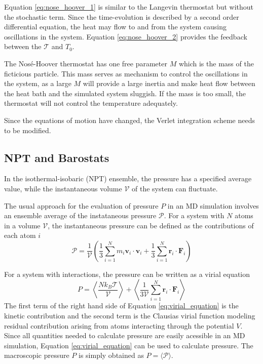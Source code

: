 Equation \ref{eq:nose_hoover_1} is similar to the Langevin thermostat but without the stochastic term.  Since the time-evolution is described by a second order differential equation, the heat may flow to and from the system causing oscillations in the system. Equation \ref{eq:nose_hoover_2} provides the feedback between the $\mathcal{T}$ and $T_0$.

The Nos\'e-Hoover thermostat has one free parameter $M$ which is the mass of the ficticious particle.  This mass serves as mechanism to control the oscillations in the system, as a large $M$ will provide a large inertia and make heat flow between the heat bath and the simulated system sluggish.  If the mass is too small, the thermostat will not control the temperature adequately.

Since the equations of motion have changed, the Verlet integration scheme needs to be modified.

\subsection{NPT and Barostats}
\label{sec:npt_ensemble}
In the isothermal-isobaric (NPT) ensemble, the pressure has a specified average value, while the instantaneous volume $\mathcal{V}$ of the system can fluctuate.

The usual approach for the evaluation of pressure $P$ in an MD simulation involves an ensemble average of the instataneous pressure $\mathcal{P}$\cite{allen1987_md}.  For a system with $N$ atoms in a volume $\mathcal{V}$, the instantaneous pressure can be defined as the contributions of each atom $i$
\begin{equation}
  \mathcal{P}
  =
  \frac{1}{\mathcal{V}}
  \left(
    \frac{1}{3}
    \sum_{i=1}^N m_i \bm{v}_i  \cdot \bm{v}_i
    +
    \frac{1}{3}
    \sum_{i=1}^N \bm{r}_i \cdot \bm{F}_i
  \right)
\end{equation}

For a system with interactions, the pressure can be written as a virial equation\cite{tadmor2011_md}
\begin{equation}
  \label{eq:virial_equation}
  P
	=
	\left\langle
	  \frac{N k_B \mathcal{T}}{\mathcal{V}}
  \right\rangle
  +
	\left\langle
	  \frac{1}
		     {3\mathcal{V}}
    \sum_{i=1}^N
        \bm{r}_i \cdot \bm{F}_{i}
	\right\rangle
\end{equation}
The first term of the right hand side of Equation \ref{eq:virial_equation} is the kinetic contribution and the second term is the Clausias virial function modeling residual contribution arising from atoms interacting through the potential $V$.  Since all quantities needed to calculate pressure are easily acessible in an MD simulation, Equation \ref{eq:virial_equation} can be used to calculate pressure.  The macroscopic pressure $P$ is simply obtained as $P=\langle \mathcal{P} \rangle$.

